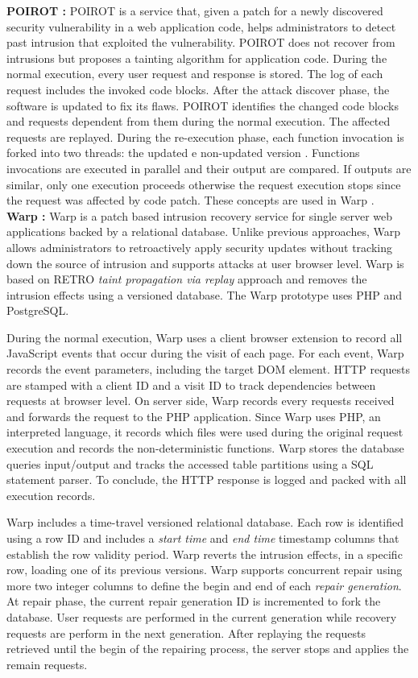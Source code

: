 \textbf{POIROT \cite{poirot}:} POIROT is a service that, given a patch for a newly discovered security vulnerability in a web application code, helps administrators to detect past intrusion that exploited the vulnerability. POIROT does not recover from intrusions but proposes a tainting algorithm for application code. During the normal execution, every user request and response is stored. The log of each request includes the invoked code blocks. After the attack discover phase, the software is updated to fix its flaws. POIROT identifies the changed code blocks and requests dependent from them during the normal execution. The affected requests are replayed. During the re-execution phase, each function invocation is forked into two threads: the updated e non-updated version \cite{Wang2011}. Functions invocations are executed in parallel and their output are compared. If outputs are similar, only one execution proceeds otherwise the request execution stops since the request was affected by code patch. These concepts are used in Warp \cite{warp}.\\


\textbf{Warp \cite{warp}:} Warp is a patch based intrusion recovery service for single server web applications backed by a relational database. Unlike previous approaches, Warp allows administrators to retroactively apply security updates without tracking down the source of intrusion and supports attacks at user browser level. Warp is based on RETRO \cite{retro} \emph{taint propagation via replay} approach and removes the intrusion effects using a versioned database. The Warp prototype uses PHP and PostgreSQL. 

During the normal execution, Warp uses a client browser extension to record all JavaScript events that occur during the visit of each page. For each event, Warp records the event parameters, including the target DOM element. HTTP requests are stamped with a client ID and a visit ID to track dependencies between requests at browser level. On server side, Warp records every requests received and forwards the request to the PHP application. Since Warp uses PHP, an interpreted language, it records which files were used during the original request execution and records the non-deterministic functions. Warp stores the database queries input/output and tracks the accessed table partitions using a SQL statement parser. To conclude, the HTTP response is logged and packed with all execution records.

Warp includes a time-travel versioned relational database. Each row is identified using a row ID and includes a \textit{start time} and \textit{end time} timestamp columns that establish the row validity period. Warp reverts the intrusion effects, in a specific row, loading one of its previous versions. Warp supports concurrent repair using more two integer columns to define the begin and end of each \textit{repair generation}. At repair phase, the current repair generation ID is incremented to fork the database. User requests are performed in the current generation while recovery requests are perform in the next generation. After replaying the requests retrieved until the begin of the repairing process, the server stops and applies the remain requests.

